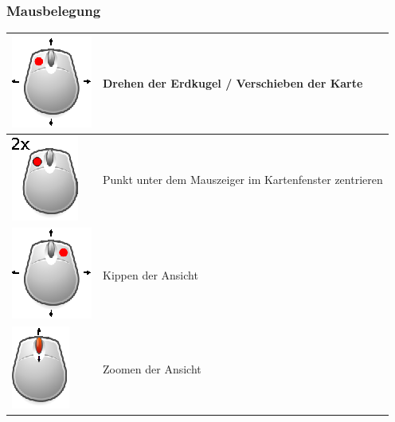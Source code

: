 \documentclass[10pt]{scrreprt}
\begin{document}
\subsubsection*{Mausbelegung} 
\begin{tabular}{|>{\centering \arraybackslash}m{3cm}|m{10cm}|}
\hline
\includegraphics[scale=1.0]{images/mouseDrag_left.eps} & Drehen der Erdkugel / Verschieben der Karte \\ 
\hline 
\includegraphics[scale=1.0]{images/mouseDoubleClick_left.eps} & Punkt unter dem Mauszeiger im Kartenfenster zentrieren \\
\hline
\includegraphics[scale=1.0]{images/mouseDrag_right.eps} & Kippen der Ansicht \\
\hline
\includegraphics[scale=1.0]{images/mouse_scrollen.eps} & Zoomen der Ansicht \\
\hline
\end{tabular} 


\vspace{3mm}
\end{document}
